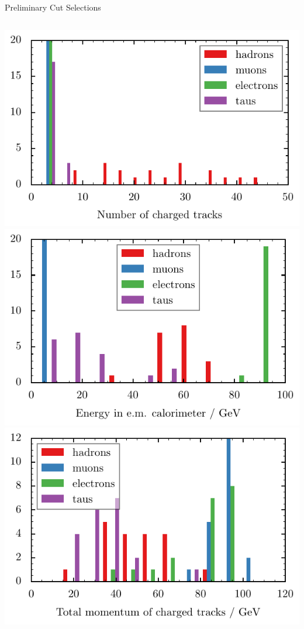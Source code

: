\documentclass[11pt,xcolor=dvipsnames,professionalfonts]{beamer}
\begin{document}
\begin{frame}{Preliminary Cut Selections}
	\begin{columns}
		\includegraphics[width=1.0\textwidth]{./talkfigs/pdf/Ctrk(N).pdf}\\
		\includegraphics[width=1.0\textwidth]{./talkfigs/pdf/Ecal(SumE).pdf}
		\includegraphics[width=1.0\textwidth]{./talkfigs/pdf/Ctrk(Sump).pdf}\\

\end{columns}
\end{frame}
\end{document}
